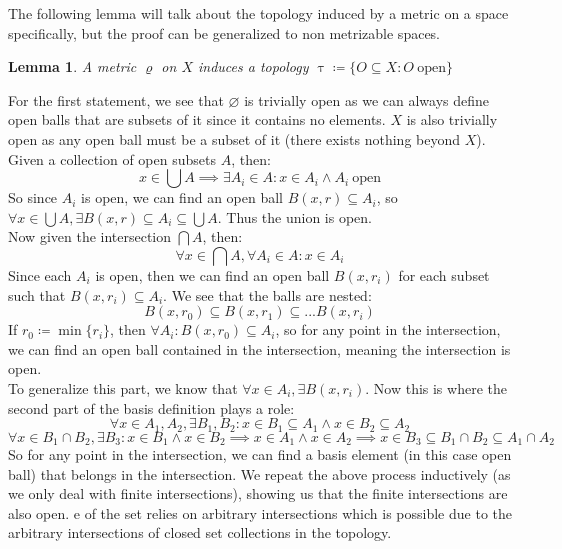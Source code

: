 \documentclass{article}
\newtheorem{lem}{Lemma}[section]
\begin{document}
The following lemma will talk about the topology induced by a metric on a space specifically, but the proof can be generalized to non metrizable spaces.

\pagebreak
\begin{lem}
    A metric $\varrho$ on $X$ induces a topology $\uptau \coloneq \{O \subseteq X: O \ \text{open}\}$
\end{lem}
For the first statement, we see that $\varnothing$ is trivially open as we can always define open balls that are subsets of it since it contains no elements. $X$ is also trivially open as any open ball must be a subset of it (there exists nothing beyond $X$).\\

Given a collection of open subsets $A$, then:
\begin{equation*}
    x \in \bigcup A \implies \exists A_i \in A: x \in A_i \land A_i \ \text{open}
\end{equation*}
So since $A_i$ is open, we can find an open ball $B(x, r) \subseteq A_i$, so $\forall x \in \bigcup A, \exists B(x, r) \subseteq A_i \subseteq \bigcup A$. Thus the union is open.\\

Now given the intersection $\bigcap A$, then:
\begin{equation*}
    \forall x \in \bigcap A, \forall A_i \in A: x \in A_i
\end{equation*}
Since each $A_i$ is open, then we can find an open ball $B(x, r_i)$ for each subset such that $B(x, r_i) \subseteq A_i$. We see that the balls are nested:
\begin{equation*}
    B(x, r_0) \subseteq B(x, r_1) \subseteq ... B(x, r_i)
\end{equation*}
If $r_0 \coloneq \min\{r_i\}$, then $\forall A_i: B(x, r_0) \subseteq A_i$, so for any point in the intersection, we can find an open ball contained in the intersection, meaning the intersection is open.\\

To generalize this part, we know that $\forall x \in A_i, \exists B(x, r_i)$. Now this is where the second part of the basis definition plays a role:
\begin{equation*}
    \forall x \in A_1, A_2, \exists B_1, B_2: x \in B_1 \subseteq A_1 \land x \in B_2 \subseteq A_2
\end{equation*}
\begin{equation*}
    \forall x \in B_1 \cap B_2, \exists B_3: x \in B_1 \land x \in B_2 \implies x \in A_1 \land x \in A_2 \implies x \in B_3 \subseteq B_1 \cap B_2 \subseteq A_1 \cap A_2
\end{equation*}
So for any point in the intersection, we can find a basis element (in this case open ball) that belongs in the intersection. We repeat the above process inductively (as we only deal with finite intersections), showing us that the finite intersections are also open.
e of the set relies on arbitrary intersections which is possible due to the arbitrary intersections of closed set collections in the topology.
\end{document}
